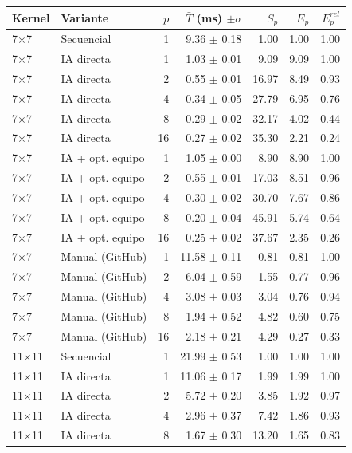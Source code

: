 \begin{tabular}{llrrrrr}
\toprule
Kernel & Variante & $p$ & $\bar{T}$ (ms) $\pm\sigma$ & $S_p$ & $E_p$ & $E^{rel}_p$ \\
\midrule
7$\times$7 & Secuencial & 1 & 9.36 $\pm$ 0.18 & 1.00 & 1.00 & 1.00 \\
7$\times$7 & IA directa & 1 & 1.03 $\pm$ 0.01 & 9.09 & 9.09 & 1.00 \\
7$\times$7 & IA directa & 2 & 0.55 $\pm$ 0.01 & 16.97 & 8.49 & 0.93 \\
7$\times$7 & IA directa & 4 & 0.34 $\pm$ 0.05 & 27.79 & 6.95 & 0.76 \\
7$\times$7 & IA directa & 8 & 0.29 $\pm$ 0.02 & 32.17 & 4.02 & 0.44 \\
7$\times$7 & IA directa & 16 & 0.27 $\pm$ 0.02 & 35.30 & 2.21 & 0.24 \\
7$\times$7 & IA + opt. equipo & 1 & 1.05 $\pm$ 0.00 & 8.90 & 8.90 & 1.00 \\
7$\times$7 & IA + opt. equipo & 2 & 0.55 $\pm$ 0.01 & 17.03 & 8.51 & 0.96 \\
7$\times$7 & IA + opt. equipo & 4 & 0.30 $\pm$ 0.02 & 30.70 & 7.67 & 0.86 \\
7$\times$7 & IA + opt. equipo & 8 & 0.20 $\pm$ 0.04 & 45.91 & 5.74 & 0.64 \\
7$\times$7 & IA + opt. equipo & 16 & 0.25 $\pm$ 0.02 & 37.67 & 2.35 & 0.26 \\
7$\times$7 & Manual (GitHub) & 1 & 11.58 $\pm$ 0.11 & 0.81 & 0.81 & 1.00 \\
7$\times$7 & Manual (GitHub) & 2 & 6.04 $\pm$ 0.59 & 1.55 & 0.77 & 0.96 \\
7$\times$7 & Manual (GitHub) & 4 & 3.08 $\pm$ 0.03 & 3.04 & 0.76 & 0.94 \\
7$\times$7 & Manual (GitHub) & 8 & 1.94 $\pm$ 0.52 & 4.82 & 0.60 & 0.75 \\
7$\times$7 & Manual (GitHub) & 16 & 2.18 $\pm$ 0.21 & 4.29 & 0.27 & 0.33 \\
\midrule
11$\times$11 & Secuencial & 1 & 21.99 $\pm$ 0.53 & 1.00 & 1.00 & 1.00 \\
11$\times$11 & IA directa & 1 & 11.06 $\pm$ 0.17 & 1.99 & 1.99 & 1.00 \\
11$\times$11 & IA directa & 2 & 5.72 $\pm$ 0.20 & 3.85 & 1.92 & 0.97 \\
11$\times$11 & IA directa & 4 & 2.96 $\pm$ 0.37 & 7.42 & 1.86 & 0.93 \\
11$\times$11 & IA directa & 8 & 1.67 $\pm$ 0.30 & 13.20 & 1.65 & 0.83 \\

\end{tabular}
